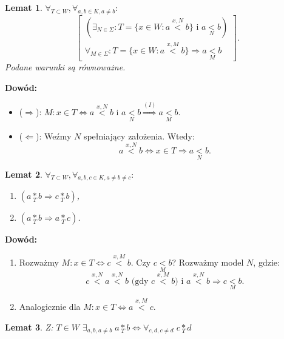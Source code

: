 \documentclass[12pt,a4paper]{article}
\theoremstyle{break}
\newtheorem{lemma}{Lemat}[section]
\begin{document}
	\begin{lemma}
		$\forall_{T \subset W}, \forall_{a, b \in K, a \neq b}:$
		\[
		\begin{bmatrix}
			(\exists_{N \in \Sigma} : T = \{x \in W : a \overset{x,N}{<} b\} \text{ i } a \underset{N}{<} b) \\
			\forall_{M \in \Sigma}: T = \{x \in W : a \overset{x,M}{<} b\} \Rightarrow a \underset{M}{<} b
		\end{bmatrix}.
		\]
		Podane warunki są równoważne.
	\end{lemma}
	
	\noindent \textbf{Dowód:}
	\begin{itemize}
		\item ($\Rightarrow$): $M : x \in T \Leftrightarrow a \overset{x,N}{<} b$ i $a \underset{N}{<} b \overset{(I)}{\Rightarrow} a \underset{M}{<} b$.
		\item ($\Leftarrow$): Weźmy $N$ spełniający założenia. Wtedy:
		\[
		a \overset{x,N}{<} b \Leftrightarrow x \in T \Rightarrow a \underset{N}{<} b.
		\]
	\end{itemize}
	
	\begin{lemma}
		$\forall_{T \subset W}, \forall_{a, b, c \in K, a \neq b \neq c}:$
		\begin{enumerate}
			\item $(a \underset{T}{*} b \Rightarrow c \underset{T}{*} b)$,
			\item $(a \underset{T}{*} b \Rightarrow a \underset{T}{*} c)$.
		\end{enumerate}
	\end{lemma}
	
	\noindent \textbf{Dowód:}
	\begin{enumerate}
		\item[Ad 1.] Rozważmy $M: x \in T \Leftrightarrow c \overset{x,M}{<} b$. Czy $c \underset{M}{<} b$?
		Rozważmy model $N$, gdzie:
		\[
		c \overset{x,N}{<} a \overset{x,N}{<} b \text{ (gdy } c \overset{x,M}{<} b \text{) i } a \overset{x,N}{<} b \Rightarrow c \underset{M}{<} b.
		\]
		
		\item[Ad 2.] Analogicznie dla $M : x \in T \Leftrightarrow a \overset{x,M}{<} c$.
	\end{enumerate}
	\begin{lemma}
		Z: $T \in W$  
		$\exists_{a,b, a\neq b} \; a\underset{T}{*}b \Leftrightarrow \forall_{c,d, c\neq d} \; c\underset{T}{*}d$
	\end{lemma}
	
\end{document}
